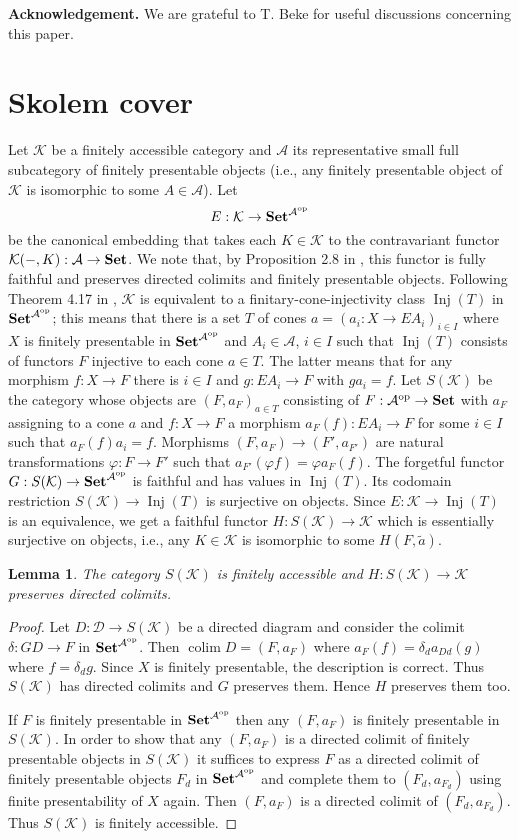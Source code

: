 \documentclass[12pt]{amsart}
\newtheorem{lemma}[theo]{Lemma}
\newcommand\Inj{\operatorname{Inj}}
\newcommand\op{\operatorname{op}}
\newcommand\Set{\operatorname{\bf Set}}
\newcommand\colim{\operatorname{colim}}
\newcommand\ca{\mathcal {A}}
\newcommand\cd{\mathcal {D}}
\newcommand\ck{\mathcal {K}}
\begin{document}
\vskip 1mm
\noindent
{\bf Acknowledgement.}  We are grateful to T. Beke for useful discussions concerning this paper.

\section{Skolem cover}
Let $\ck$ be a finitely accessible category and $\ca$ its representative small full subcategory of finitely presentable objects
(i.e., any finitely presentable object of $\ck$ is  isomorphic to some $A\in \ca$). Let 
$$
E:\ck\to\Set^{\ca^{\op}}
$$ 
be the canonical embedding that takes each $K\in\ck$ to the contravariant functor $\ck(-,K):\ca\to\Set$. We note that, by Proposition 2.8 in \cite{AR},
this functor is fully faithful and preserves directed colimits and finitely presentable objects. Following Theorem 4.17 in \cite{AR}, $\ck$
is equivalent to a finitary-cone-injectivity class $\Inj(T)$ in $\Set^{\ca^{\op}}$; this means that there is a set $T$ of cones $a=(a_i:X\to EA_i)_{i\in I}$ 
where $X$ is finitely presentable in $\Set^{\ca^{\op}}$ and $A_i\in \ca$, $i\in I$ such that $\Inj(T)$ consists of functors $F$ injective to each cone 
$a\in T$. The latter means that for any morphism $f:X\to F$ there is $i\in I$ and $g:EA_i\to F$ with $ga_i=f$.
Let $S(\ck)$ be the category whose objects are $(F,a_F)_{a\in T}$ consisting of $F:\ca^{\op}\to\Set$ with $a_F$ assigning to a cone $a$ and
$f:X\to F$ a morphism $a_F(f):EA_i\to F$ for some $i\in I$ such that $a_F(f)a_i=f$. Morphisms $(F,a_F)\to (F',a_{F'})$ are
natural transformations $\varphi:F\to F'$ such that $a_{F'}(\varphi f)=\varphi a_F(f)$. The forgetful functor $G:S(\ck)\to\Set^{\ca^{\op}}$
is faithful and has values in $\Inj(T)$. Its codomain restriction $S(\ck)\to\Inj(T)$ is surjective on objects. Since $E:\ck\to\Inj(T)$ is an equivalence,
we get a faithful functor $H:S(\ck)\to\ck$ which is essentially surjective on objects, i.e., any $K\in\ck$ is isomorphic to some $H(F,\tilde{a})$.

\begin{lemma}\label{le2.1}
The category $S(\ck)$ is finitely accessible and $H:S(\ck)\to\ck$ preserves directed colimits.
\end{lemma}
\begin{proof}
Let $D:\cd\to S(\ck)$ be a directed diagram and consider the colimit $\delta: GD\to F$ in $\Set^{\ca^{\op}}$. Then $\colim D =(F,a_F)$ where 
$a_F(f)=\delta_d a_{Dd}(g)$ where $f=\delta_d g$. Since $X$ is finitely presentable, the description is correct. Thus $S(\ck)$ has directed
colimits and $G$ preserves them. Hence $H$ preserves them too.

If $F$ is finitely presentable in $\Set^{\ca^{\op}}$ then any $(F,a_F)$ is finitely presentable in $S(\ck)$. In order to show that any $(F,a_F)$
is a directed colimit of finitely presentable objects in $S(\ck)$ it suffices to express $F$ as a directed colimit of finitely presentable objects
$F_d$ in $\Set^{\ca^{\op}}$ and complete them to $(F_d,a_{F_d})$ using finite presentability of $X$ again. Then $(F,a_F)$ is a directed colimit of
$(F_d,a_{F_d})$. Thus $S(\ck)$ is finitely accessible.
\end{proof}  
\end{document}
